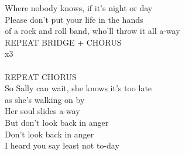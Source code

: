 Where  nobody  knows,  if it's night or  day   \\
 Please don't put your  life in the  hands\\
of a  rock and roll  band,  who'll throw it all a-way   \\
REPEAT BRIDGE + CHORUS\\
   x3\\
       \\
REPEAT CHORUS\\
 So  Sally can  wait, she  knows it's too  late\\
as she's  walking on  by   \\
 Her soul  slides a-way\\
But don't look  back in anger\\
Don't look  back in anger\\
I heard you  say        least not to-day\\
